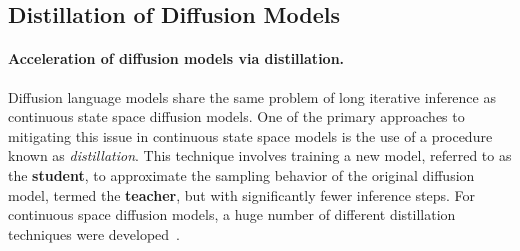 
\subsection{Distillation of Diffusion Models} 

\paragraph{Acceleration of diffusion models via distillation.}
  Diffusion language models share the same problem of long iterative inference as continuous state space diffusion models. One of the primary approaches to mitigating this issue in continuous state space models is the use of a procedure known as \emph{distillation}. This technique involves training a new model, referred to as the \textbf{student}, to approximate the sampling behavior of the original diffusion model, termed the \textbf{teacher}, but with significantly fewer inference steps. For continuous space diffusion models, a huge number of different distillation techniques were developed~\citep{luhman2021knowledge, salimans2022progressive, song2023consistency}. 

